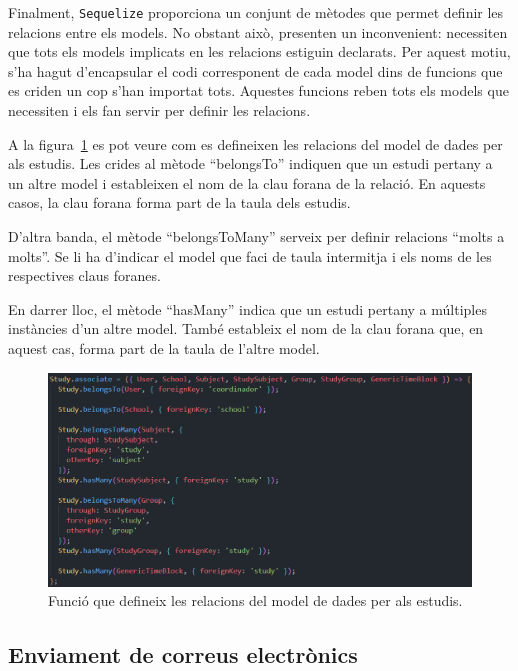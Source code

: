 \documentclass[a4paper,12pt]{ThesisStyle}
\begin{document}
Finalment, \texttt{Sequelize} proporciona un conjunt de mètodes que permet definir les relacions entre els models. No obstant això, presenten un inconvenient: necessiten que tots els models implicats en les relacions estiguin declarats. Per aquest motiu, s'ha hagut d'encapsular el codi corresponent de cada model dins de funcions que es criden un cop s'han importat tots. Aquestes funcions reben tots els models que necessiten i els fan servir per definir les relacions.

A la figura~\ref{img:associate} es pot veure com es defineixen les relacions del model de dades per als estudis. Les crides al mètode ``belongsTo'' indiquen que un estudi pertany a un altre model i estableixen el nom de la clau forana de la relació. En aquests casos, la clau forana forma part de la taula dels estudis.

D'altra banda, el mètode ``belongsToMany'' serveix per definir relacions ``molts a molts''. Se li ha d'indicar el model que faci de taula intermitja i els noms de les respectives claus foranes.

En darrer lloc, el mètode ``hasMany'' indica que un estudi pertany a múltiples instàncies d'un altre model. També estableix el nom de la clau forana que, en aquest cas, forma part de la taula de l'altre model.

\begin{figure}[H]
  \centering
  \includegraphics[width=\textwidth]{assets/code/modelsDades/associate.png}
  \caption{\label{img:associate} Funció que defineix les relacions del model de dades per als estudis.}
\end{figure}

\subsection{Enviament de correus electrònics}
\label{subsec:enviament_correus}
\end{document}
